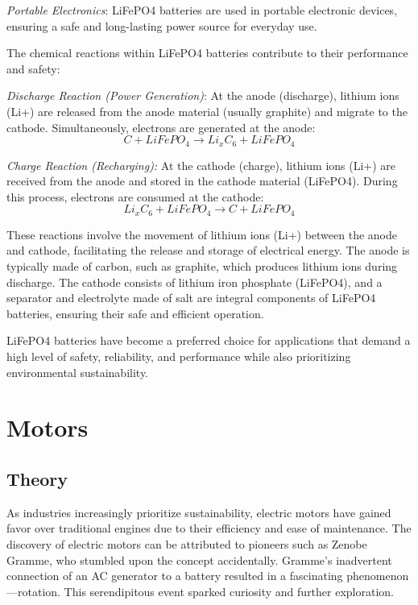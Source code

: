 \documentclass{article}
\begin{document}
\begin{flushleft}
\textit{Portable Electronics}: LiFePO4 batteries are used in portable electronic devices, ensuring a safe and long-lasting power source for everyday use.
\newline
\vspace*{1.5pt}

The chemical reactions within LiFePO4 batteries contribute to their performance and safety:
\newline

\textit{Discharge Reaction (Power Generation)}:
At the anode (discharge), lithium ions (Li+) are released from the anode material (usually graphite) and migrate to the cathode. Simultaneously, electrons are generated at the anode:
\begin{equation*}
    C + LiFePO_4 \rightarrow Li_xC_6 + LiFePO_4
\end{equation*}

\textit{Charge Reaction (Recharging):}
At the cathode (charge), lithium ions (Li+) are received from the anode and stored in the cathode material (LiFePO4). During this process, electrons are consumed at the cathode:
\begin{equation*}
    Li_xC_6 + LiFePO_4 \rightarrow C + LiFePO_4
\end{equation*}

These reactions involve the movement of lithium ions (Li+) between the anode and cathode, facilitating the release and storage of electrical energy. 
The anode is typically made of carbon, such as graphite, which produces lithium ions during discharge.
The cathode consists of lithium iron phosphate (LiFePO4), and a separator and electrolyte made of salt are integral components of LiFePO4 batteries, ensuring their safe and efficient operation.

LiFePO4 batteries have become a preferred choice for applications that demand a high level of safety, reliability, and performance while also prioritizing environmental sustainability.



\section*{Motors}
\subsection*{Theory}
As industries increasingly prioritize sustainability, electric motors have gained favor over traditional engines due to their efficiency and ease of maintenance. \newline
The discovery of electric motors can be attributed to pioneers such as Zenobe Gramme, who stumbled upon the concept accidentally. Gramme's inadvertent connection of an AC generator to a battery resulted in a fascinating phenomenon—rotation. This serendipitous event sparked curiosity and further exploration. \newline


\end{flushleft}
\end{document}
